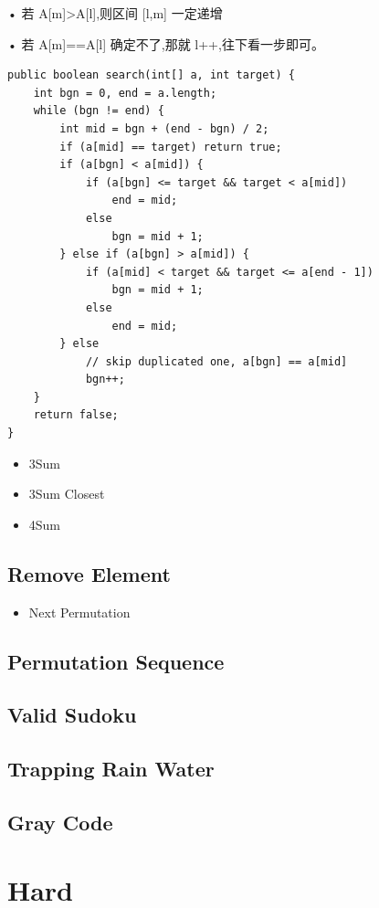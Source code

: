 \documentclass[12pt]{book}
\begin{document}
• 若 A[m]>A[l],则区间 [l,m] 一定递增

• 若 A[m]==A[l] 确定不了,那就 l++,往下看一步即可。

\lstset{language=java,label= ,caption= ,numbers=none}
\begin{lstlisting}
public boolean search(int[] a, int target) {
    int bgn = 0, end = a.length;
    while (bgn != end) {
        int mid = bgn + (end - bgn) / 2;
        if (a[mid] == target) return true;
        if (a[bgn] < a[mid]) {
            if (a[bgn] <= target && target < a[mid])
                end = mid;
            else
                bgn = mid + 1;
        } else if (a[bgn] > a[mid]) {
            if (a[mid] < target && target <= a[end - 1])
                bgn = mid + 1;
            else
                end = mid;
        } else 
            // skip duplicated one, a[bgn] == a[mid]
            bgn++;
    }
    return false;
}
\end{lstlisting}

\begin{itemize}
\item 3Sum
\item 3Sum Closest
\item 4Sum
\end{itemize}
\subsection{Remove Element}
\label{sec-1-2-4}
\begin{itemize}
\item Next Permutation
\end{itemize}
\subsection{Permutation Sequence}
\label{sec-1-2-5}
\subsection{Valid Sudoku}
\label{sec-1-2-6}
\subsection{Trapping Rain Water}
\label{sec-1-2-7}
\subsection{Gray Code}
\label{sec-1-2-8}
\section{Hard}
\label{sec-1-3}
\end{document}
